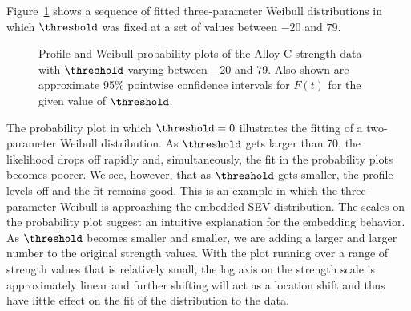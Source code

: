 \begin{example}
Figure~\ref{figure:alcoa4.var.profile.weib.ps} shows a sequence of
fitted three-parameter Weibull distributions in which $\threshold$ 
was fixed at a set of values between $-20$ and $79$.
\begin{figure}
\caption{Profile and Weibull probability plots of the Alloy-C
strength data with $\threshold$ varying between $-20$ and 79. Also shown
are approximate 95\% pointwise confidence intervals for $F(t)$ for the
given value of $\threshold$.}
\label{figure:alcoa4.var.profile.weib.ps}
\end{figure}
The probability plot in which $\threshold=0$ illustrates the fitting
of a two-parameter Weibull distribution.  As $\threshold$ gets larger
than 70, the likelihood drops off rapidly and, simultaneously, the fit
in the probability plots becomes poorer.  We see, however, that as
$\threshold$ gets smaller, the profile levels off and the fit remains
good. This is an example in which the three-parameter Weibull is
approaching the embedded SEV distribution.  The scales on the
probability plot suggest an intuitive explanation for the embedding
behavior. As $\threshold$ becomes smaller and smaller, we are adding a
larger and larger number to the original strength values. With the
plot running over a range of strength values
that is relatively small, the log axis on
the strength scale is approximately linear and further shifting will
act as a location shift and thus have little effect on the fit of the
distribution to the data.  


\end{example}
